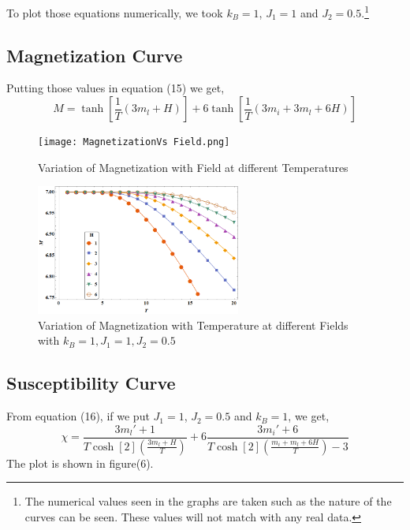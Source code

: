 \documentclass[24pt]{article}
\begin{document}
{\large To plot those equations numerically, we took $k_B =1 $, $J_1 = 1$ and $J_2 = 0.5$.}\footnote{The numerical values seen in the graphs are taken such as the nature of the curves can be seen. These values will not match with any real data. }  


\subsection{\large \textbf{Magnetization Curve}}

\begin{large}
Putting those values in equation (15) we get,\\
\begin{equation}
M = \tanh[\frac{1}{T}(3 m_l +H)]+ 6 \tanh[\frac{1}{T}(3 m_i + 3 m_l + 6 H)]
\end{equation}
\end{large}
\begin{figure}[h!]
\centering
	\texttt{[image: MagnetizationVs Field.png]}
	\caption{Variation of Magnetization with Field at different Temperatures}
	\end{figure}

\begin{figure}[h!]
\centering
	\includegraphics[width=0.6\textwidth]{Magnetization-Temperature.png}
	\caption{Variation of Magnetization with Temperature at different Fields with $k_B =1, J_1 = 1, J_2 = 0.5$}
	\end{figure}

\subsection{\large \textbf{Susceptibility Curve}}
From equation (16), if we put $J_1=1$, $J_2=0.5$ and $k_B =1$, we get,
$$
\chi = \frac{3 m_l '+1}{T \cosh[2](\frac{3 m_l + H}{T})} + 6 \frac{3 m_i '+ 6}{T \cosh[2](\frac{m_i + m_l + 6 H}{T})-3}
$$
 The plot is shown in figure(6).
 
\end{document}
